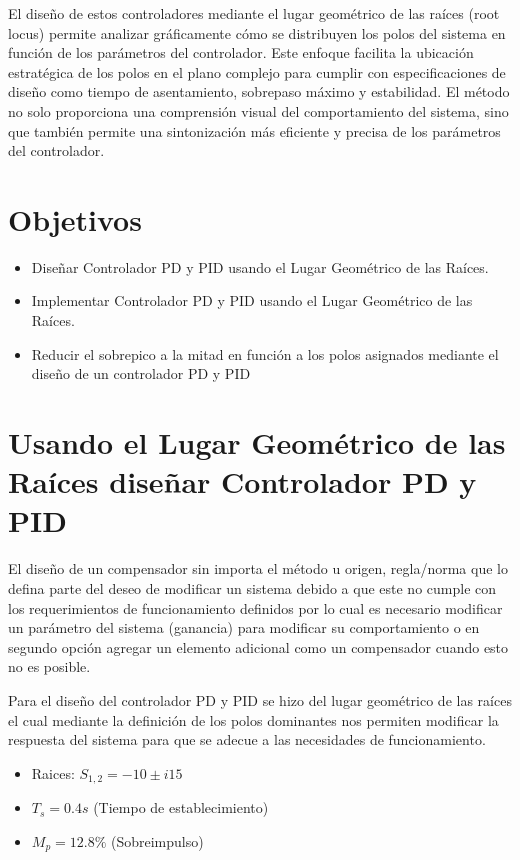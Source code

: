 \documentclass[conference]{IEEEtran}
\begin{document}
		El diseño de estos controladores mediante el lugar geométrico de las raíces (root locus) permite analizar gráficamente cómo se distribuyen los polos del sistema en función de los parámetros del controlador. Este enfoque facilita la ubicación estratégica de los polos en el plano complejo para cumplir con especificaciones de diseño como tiempo de asentamiento, sobrepaso máximo y estabilidad. El método no solo proporciona una comprensión visual del comportamiento del sistema, sino que también permite una sintonización más eficiente y precisa de los parámetros del controlador.
		
	\section{Objetivos}
	
	\begin{itemize}
		\item Diseñar Controlador PD y PID usando el Lugar Geométrico de las Raíces.
		\item Implementar Controlador PD y PID usando el Lugar Geométrico de las Raíces.
		\item Reducir el sobrepico a la mitad en función a los polos asignados mediante el diseño de un controlador PD y PID
	\end{itemize}
	
	\section{Usando el Lugar Geométrico de las Raíces diseñar Controlador PD y PID}
	
	El diseño de un compensador sin importa el método u origen, regla/norma que lo defina parte del deseo de modificar un sistema debido a que este no cumple con los requerimientos de funcionamiento definidos por lo cual es necesario modificar un parámetro del sistema (ganancia) para modificar su comportamiento o en segundo opción agregar un elemento adicional como un compensador cuando esto no es posible.
		
	Para el diseño del controlador PD y PID se hizo del lugar geométrico de las raíces el cual mediante la definición de los polos dominantes nos permiten modificar la respuesta del sistema para que se adecue a las necesidades de funcionamiento.
	
	\begin{itemize}
		\item Raices: $S_{1,2} = -10 \pm i15$
		\item $T_s = 0.4s$ (Tiempo de establecimiento)
		\item $M_p = 12.8\%$ (Sobreimpulso)
	\end{itemize}
	
\end{document}
